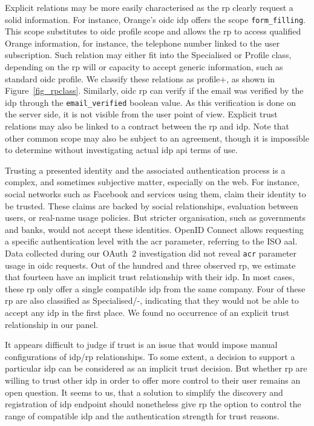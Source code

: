 Explicit relations may be more easily characterised as the \gls{rp} clearly request a solid information.
For instance, Orange's \gls{oidc} \gls{idp} offers the scope \texttt{form\_filling}.
This scope substitutes to \gls{oidc} profile scope and allows the \gls{rp} to access qualified Orange information, for instance, the telephone number linked to the user subscription.
Such relation may either fit into the Specialised or Profile class, depending on the \gls{rp} will or capacity to accept generic information, such as standard \gls{oidc} profile.
We classify these relations as profile+, as shown in Figure~\ref{fig_rpclass}.
Similarly, \gls{oidc} \gls{rp} can verify if the email was verified by the \gls{idp} through the \texttt{email\_verified} boolean value.
As this verification is done on the server side, it is not visible from the user point of view.
Explicit trust relations may also be linked to a contract between the \gls{rp} and \gls{idp}.
Note that other common scope may also be subject to an agreement, though it is impossible to determine without investigating actual \gls{idp} \gls{api} terms of use.

Trusting a presented identity and the associated authentication process is a complex, and sometimes subjective matter, especially on the web.
For instance, social networks such as Facebook and services using them, claim their identity to be trusted.
These claims are backed by social relationships, evaluation between users, or real-name usage policies. 
But stricter organisation, such as governments and banks, would not accept these identities.
OpenID Connect allows requesting a specific authentication level with the \gls{acr} parameter, referring to the ISO \gls{aal}.
Data collected during our OAuth~2 investigation did not reveal \texttt{acr} parameter usage in \gls{oidc} requests.
Out of the hundred and three observed \gls{rp}, we estimate that fourteen have an implicit trust relationship with their \gls{idp}.
In most cases, these \gls{rp} only offer a single compatible \gls{idp} from the same company.
Four of these \gls{rp} are also classified as Specialised/-, indicating that they would not be able to accept any \gls{idp} in the first place.
We found no occurrence of an explicit trust relationship in our panel.

It appears difficult to judge if trust is an issue that would impose manual configurations of \gls{idp}/\gls{rp} relationships.
To some extent, a decision to support a particular \gls{idp} can be considered as an implicit trust decision.
But whether \gls{rp} are willing to trust other \gls{idp} in order to offer more control to their user remains an open question.
It seems to us, that a solution to simplify the discovery and registration of \gls{idp} endpoint should nonetheless give \gls{rp} the option to control the range of compatible \gls{idp} and the authentication strength for trust reasons.


